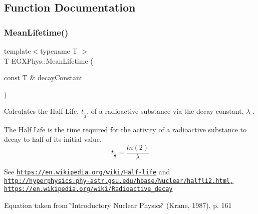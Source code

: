 \subsection{Function Documentation}
\mbox{\label{group___e_g_x_phys-_mean_lifetime_gaa9e3c2deedda4bc7a745568b06fc47eb}} 
\subsubsection{\texorpdfstring{Mean\+Lifetime()}{MeanLifetime()}}
{\footnotesize\ttfamily template$<$typename T $>$ \\
T E\+G\+X\+Phys\+::\+Mean\+Lifetime (\begin{DoxyParamCaption}\item[{const T \&}]{decay\+Constant }\end{DoxyParamCaption})}



Calculates the Half Life, $t_{\frac{1}{2}}$, of a radioactive substance via the decay constant, $\lambda$ . 

The Half Life is the time required for the activity of a radioactive substance to decay to half of its initial value. \[t_{\frac{1}{2}}=\frac{ln(2)}{\lambda}\]

See \href{https://en.wikipedia.org/wiki/Half-life}{\tt https\+://en.\+wikipedia.\+org/wiki/\+Half-\/life} and \href{http://hyperphysics.phy-astr.gsu.edu/hbase/Nuclear/halfli2.html,}{\tt http\+://hyperphysics.\+phy-\/astr.\+gsu.\+edu/hbase/\+Nuclear/halfli2.\+html,} \href{https://en.wikipedia.org/wiki/Radioactive_decay}{\tt https\+://en.\+wikipedia.\+org/wiki/\+Radioactive\+\_\+decay}

Equation taken from \char`\"{}\+Introductory Nuclear Physics\char`\"{} (Krane, 1987), p. 161


